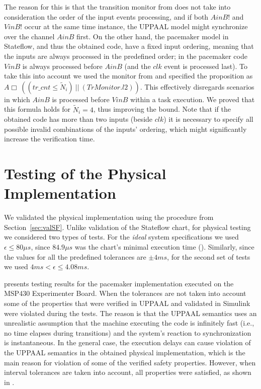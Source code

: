 The reason for this is that the transition monitor from  does not take into consideration the order of the input events processing, and if both $AinB!$ and $VinB!$ occur at the same time instance, the UPPAAL model might synchronize over the channel $AinB$ first. On the other hand, the pacemaker model in Stateflow, and thus the obtained code, have a fixed input ordering, meaning that the inputs are always processed in the predefined order; in the pacemaker code $VinB$ is always processed before $AinB$ (and the $clk$ event is processed last). To take this into account we used the monitor from  and specified the proposition as $A\Box~((tr\_cnt\leq\tilde{N}_i)~|| ~(TrMonitor.l2))$. This effectively disregards scenarios in which $AinB$ is processed before $VinB$ within a task execution. We proved that this formula holds for $\tilde{N}_i=4$, thus improving the bound.
Note that if the obtained code has more than two inputs (beside $clk$) it is necessary to specify all possible invalid combinations of the inputs' ordering, which might significantly increase the verification time. 
\section{Testing of the Physical Implementation}
\label{sec:testing}


We validated the physical implementation using the procedure from Section~\ref{sec:valSF}. Unlike validation of the Stateflow chart, for physical testing we considered two types of tests. For the \textit{ideal} system specifications we used $\epsilon \leq 80\mu s$, since $84.9\mu s$ was the chart's minimal execution time (). Similarly, since the values for all the predefined tolerances are $\pm 4 ms$, for the second set of tests we used $4ms < \epsilon \leq 4.08 ms$.

 presents testing results for the pacemaker implementation executed on the MSP430 Experimenter Board. When the tolerances are not taken into account some of the properties that were verified in UPPAAL and validated in Simulink were violated during the tests. The reason is that the UPPAAL semantics uses an unrealistic assumption that the machine executing the code is infinitely fast (i.e., no time elapses during transitions) and the system's reaction to synchronization is instantaneous. In the general case, the execution delays can cause violation of the UPPAAL semantics in the obtained physical implementation, which is the main reason for violation of some of the verified safety properties. However, when interval tolerances are taken into account, all properties were satisfied, as shown in .

